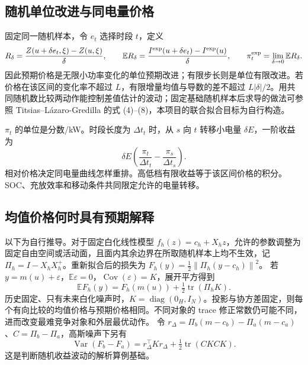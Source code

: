 \documentclass[UTF8,fontset=fandol,11pt,a4paper]{ctexart}
\newcommand{\norm}[1]{\left\lVert#1\right\rVert}
\begin{document}
\subsection{随机单位改进与同电量价格}
固定同一随机样本，令 $e_t$ 选择时段 $t$，定义
\begin{equation}
R_\delta=\frac{Z(u+\delta e_t,\xi)-Z(u,\xi)}{\delta},\qquad
\mathbb E R_\delta=\frac{I^{\rm exp}(u+\delta e_t)-I^{\rm exp}(u)}{\delta},\qquad
\pi_t^{\rm exp}=\lim_{\delta\to0}\mathbb E R_\delta.
\label{eq:gp-unit}
\end{equation}
因此预期价格是无限小功率变化的单位预期改进；有限步长则是单位有限改进。若价格在该区间的变化率不超过 $L$，有限增量均值与导数的差不超过 $L|\delta|/2$。用共同随机数比较两动作能控制差值估计的波动；固定基础随机样本后求导的做法可参照 Titsias--L\'azaro-Gredilla 的式 (4)--(8)\cite{gp-titsias}，本项目的联合拟合目标为自行构造。

$\pi_t$ 的单位是分数/kW。时段长度为 $\Delta t_t$ 时，从 $s$ 向 $t$ 转移小电量 $\delta E$，一阶收益为
\begin{equation}
\delta E\left(\frac{\pi_t}{\Delta t_t}-\frac{\pi_s}{\Delta t_s}\right).
\label{eq:gp-energy-price}
\end{equation}
相对价格决定同电量曲线怎样重排。高低档有限收益等于该区间价格的积分。SOC、充放效率和移动条件共同限定允许的电量转移。

\subsection{均值价格何时具有预期解释}
以下为自行推导。对于固定白化线性模型 $f_h(z)=c_h+X_hz$，允许的参数调整为固定自由空间或活动面，且面内其余边界在所取随机样本上均不生效，记
$\Pi_h=I-X_hX_h^+$。重新拟合后的损失为
$F_h(y)=\tfrac12\norm{\Pi_h(y-c_h)}^2$。
若 $y=m(u)+\varepsilon$，$\mathbb E\varepsilon=0$，$\operatorname{Cov}(\varepsilon)=K$，展开平方得到
\begin{equation}
\mathbb EF_h(y)=F_h(m(u))+\tfrac12\operatorname{tr}(\Pi_hK).
\label{eq:gp-trace}
\end{equation}
历史固定、只有未来白化噪声时，$K=\operatorname{diag}(0_H,I_N)$。投影与协方差固定，则每个有向比较的均值价格与预期价格相同。不同对象的 trace 修正常数仍可能不同，进而改变最难竞争对象和外层最优动作。
令 $r_\Delta=\Pi_b(m-c_b)-\Pi_a(m-c_a)$、$C=\Pi_b-\Pi_a$，高斯噪声下另有
\begin{equation}
\operatorname{Var}(F_b-F_a)=r_\Delta^\top Kr_\Delta+\tfrac12\operatorname{tr}(CKCK).
\label{eq:gp-variance}
\end{equation}
这是判断随机收益波动的解析算例基础。
\end{document}
